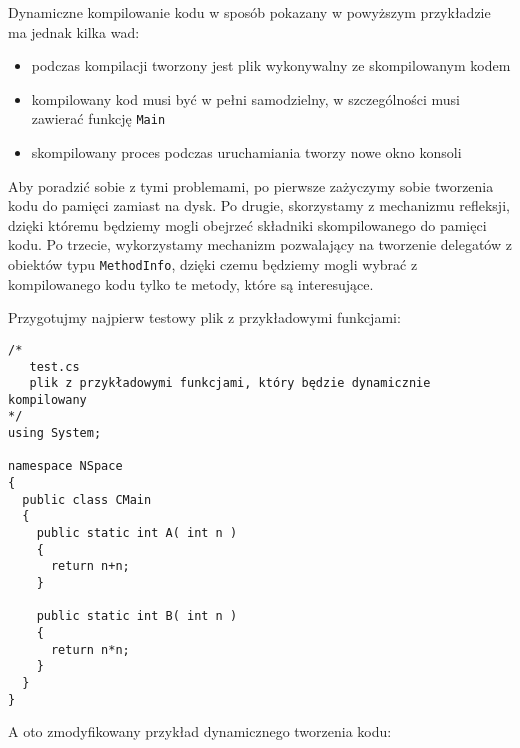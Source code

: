 Dynamiczne kompilowanie kodu w sposób pokazany w powyższym przykładzie ma jednak kilka wad:
\begin{itemize}
\item podczas kompilacji tworzony jest plik wykonywalny ze skompilowanym kodem
\item kompilowany kod musi być w pełni samodzielny, w szczególności musi zawierać funkcję {\tt Main}
\item skompilowany proces podczas uruchamiania tworzy nowe okno konsoli
\end{itemize}

Aby poradzić sobie z tymi problemami, po pierwsze zażyczymy sobie tworzenia kodu do pamięci zamiast
na dysk. Po drugie, skorzystamy z mechanizmu refleksji, dzięki któremu będziemy mogli obejrzeć
składniki skompilowanego do pamięci kodu. Po trzecie, wykorzystamy mechanizm pozwalający na tworzenie
delegatów z obiektów typu {\tt MethodInfo}, dzięki czemu będziemy mogli wybrać z kompilowanego kodu 
tylko te metody, które są interesujące.

Przygotujmy najpierw testowy plik z przykładowymi funkcjami:

\begin{scriptsize}
\begin{verbatim}
/* 
   test.cs 
   plik z przykładowymi funkcjami, który będzie dynamicznie kompilowany 
*/
using System;

namespace NSpace
{
  public class CMain
  {
    public static int A( int n )
    {
      return n+n; 
    }

    public static int B( int n )
    {
      return n*n; 
    }
  }
}
\end{verbatim}
\end{scriptsize}

A oto zmodyfikowany przykład dynamicznego tworzenia kodu:


